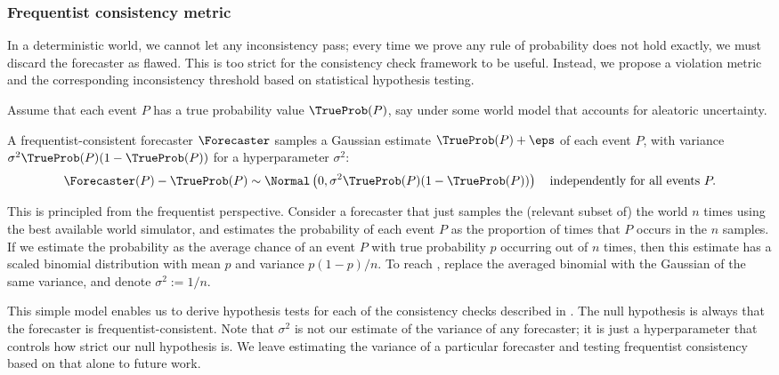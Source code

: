 
\newcommand{\betamin}{\beta_{\textsc{min}}}

\subsubsection{Frequentist consistency metric}
\label{cfc/app:frequentist-metric}
In a deterministic world, we cannot let any inconsistency pass; every time we prove any rule of probability does not hold exactly, we must discard the forecaster as flawed.
This is too strict for the consistency check framework to be useful.
Instead, we propose a violation metric and the corresponding inconsistency threshold based on statistical hypothesis testing.

Assume that each event $P$ has a true probability value $\TrueProb(P)$, say under some world model that accounts for aleatoric uncertainty.
\begin{definition}
\label{def:frequentist-consistency}
A frequentist-consistent forecaster $\Forecaster$ samples a Gaussian estimate $\TrueProb(P) + \eps$ of each event $P$, with variance $\sigma^2 \TrueProb(P) (1 - \TrueProb(P))$ for a hyperparameter $\sigma^2$:
\begin{align}
    \label{eq:frequentist_consistency}
    \Forecaster(P) - \TrueProb(P) \sim \Normal\left(0, \sigma^2 \TrueProb(P) (1 - \TrueProb(P))\right) \quad \text{independently for all events } P.
\end{align}
\end{definition}
This is principled from the frequentist perspective.
Consider a forecaster that just samples the (relevant subset of) the world $n$ times using the best available world simulator, and estimates the probability of each event $P$ as the proportion of times that $P$ occurs in the $n$ samples.
If we estimate the probability as the average chance of an event $P$ with true probability $p$ occurring out of $n$ times, then this estimate has a scaled binomial distribution with mean $p$ and variance $p(1-p) / n$.
To reach , replace the averaged binomial with the Gaussian of the same variance, and denote $\sigma^2 := 1/n$.


This simple model enables us to derive hypothesis tests for each of the consistency checks described in .
The null hypothesis is always that the forecaster is frequentist-consistent.
Note that $\sigma^2$ is not our estimate of the variance of any forecaster; it is just a hyperparameter that controls how strict our null hypothesis is.
We leave estimating the variance of a particular forecaster and testing frequentist consistency based on that alone to future work.

